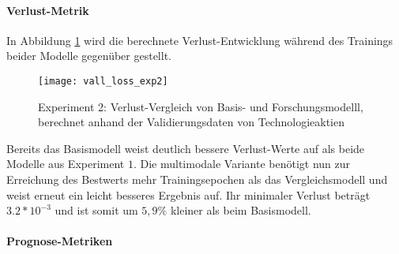 \paragraph*{Verlust-Metrik} 
In Abbildung \ref{fig:vall_loss_exp2} wird die berechnete Verlust-Entwicklung während des Trainings beider Modelle gegenüber gestellt.
\begin{figure}[H]
	\texttt{[image: vall\_loss\_exp2]}
	\caption{Experiment 2: Verlust-Vergleich von Basis- und Forschungsmodelll, berechnet anhand der Validierungsdaten von Technologieaktien}
	\label{fig:vall_loss_exp2}
\end{figure}
Bereits das Basismodell weist deutlich bessere Verlust-Werte auf als beide Modelle aus Experiment $1$. Die multimodale Variante benötigt nun zur Erreichung des Bestwerts mehr Trainingsepochen als das Vergleichsmodell und weist erneut ein leicht besseres Ergebnis auf. Ihr minimaler Verlust beträgt $3.2*10^{-3}$ und ist somit um $5,9\%$ kleiner als beim Basismodell.

\paragraph*{Prognose-Metriken} 

